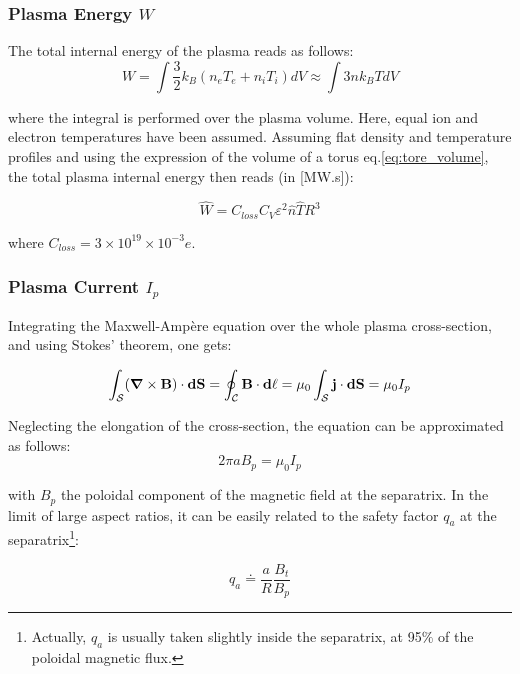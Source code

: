 \subsubsection{Plasma Energy $W$}
The total internal energy of the plasma reads as follows:
\begin{equation*}
W  = \int \frac{3}{2} k_B \left( n_e T_e + n_i T_i \right ) dV 
\approx \int 3 n k_BT dV
\end{equation*}

\noindent
where the integral is performed over the plasma volume. Here, equal ion and electron temperatures have been assumed. Assuming flat density and temperature profiles and using the expression of the volume of a torus eq.\ref{eq:tore_volume}, the total plasma internal energy then reads (in [MW.s]):

\begin{equation}
\boxed{
	\hat W = C_{loss} C_V \varepsilon^2  \hat n \hat T R^3
	\label{eq:total_energy}
}
\end{equation}

\noindent
where $C_{loss} = 3 \times 10^{19} \times 10^{-3} e$.

\subsubsection{Plasma Current $I_p$}

Integrating the Maxwell-Ampère equation over the whole plasma cross-section, and using Stokes' theorem, one gets:

\begin{equation*}
\int_\mathcal{S} (\mbox{\boldmath${\nabla}$}\times {\mathbf B}) \cdot \mathbf{dS} = 
\oint_\mathcal{C} \mathbf{B} \cdot \mathbf{d\ell}
= \mu_0 \int_\mathcal{S} {\mathbf j} \cdot \mathbf{dS} = \mu_0 I_p
\end{equation*}

Neglecting the elongation of the cross-section, the equation can be approximated as follows:
$$
2\pi a B_p = \mu_0 I_p
$$

\noindent
with $B_p$ the poloidal component of the magnetic field at the separatrix. In the limit of large aspect ratios, it can be easily related to the safety factor $q_a$ at the separatrix\footnote{Actually, $q_a$ is usually taken slightly inside the separatrix, at 95$\%$ of the poloidal magnetic flux.}:

\begin{equation*}
q_a \doteq \frac{a}{R} \frac{B_t}{B_p} 
\end{equation*}


